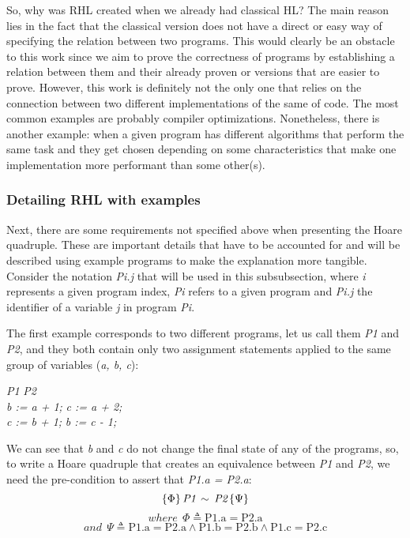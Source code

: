 So, why was RHL created when we already had classical HL? 
The main reason lies in the fact that the classical version does not have a direct or easy way of specifying the relation between two programs. 
This would clearly be an obstacle to this work since we aim to prove the correctness of programs by establishing a relation between them and their already proven or versions that are easier to prove.
However, this work is definitely not the only one that relies on the connection between two different implementations of the same of code.
The most common examples are probably compiler optimizations.
Nonetheless, there is another example: when a given program has different algorithms that perform the same task and they get chosen depending on some characteristics that make one implementation more performant than some other(s).


\subsubsection{Detailing RHL with examples}
\label{sub:relational_hoare_logic_examples}

Next, there are some requirements not specified above when presenting the Hoare quadruple.
These are important details that have to be accounted for and will be described using example programs to make the explanation more tangible.
Consider the notation \emph{Pi.j} that will be used in this subsubsection, where \emph{i} represents a given program index, \emph{Pi} refers to a given program and \emph{Pi.j} the identifier of a variable \emph{j} in program \emph{Pi}.

The first example corresponds to two different programs, let us call them \emph{P1} and \emph{P2}, and they both contain only two assignment statements applied to the same group of variables (\emph{a, b, c}): 
\begin{tabbing}
  \hspace{2cm}\= \emph{P1} \hspace{2cm} \= \emph{P2} \\ 
  \> \emph{b := a + 1;} \> \emph{c := a + 2;} \\
  \> \emph{c := b + 1;} \> \emph{b := c - 1;}
\end{tabbing}

We can see that \emph{b} and \emph{c} do not change the final state of any of the programs, so, to write a Hoare quadruple that creates an equivalence between \emph{P1} and \emph{P2}, we need the pre-condition to assert that \emph{P1.a = P2.a}:
\[ \{ \Phi \} \, \emph{P1} \, \sim \, \emph{P2} \, \{ \Psi \} \]
\vspace{-20pt}
\[ where \ \ \Phi \triangleq \text{P1.a} = \text{P2.a} \]
\vspace{-25pt}
\[ and \ \ \Psi \triangleq \text{P1.a} = \text{P2.a} \land \text{P1.b} = \text{P2.b} \land \text{P1.c} = \text{P2.c} \]

